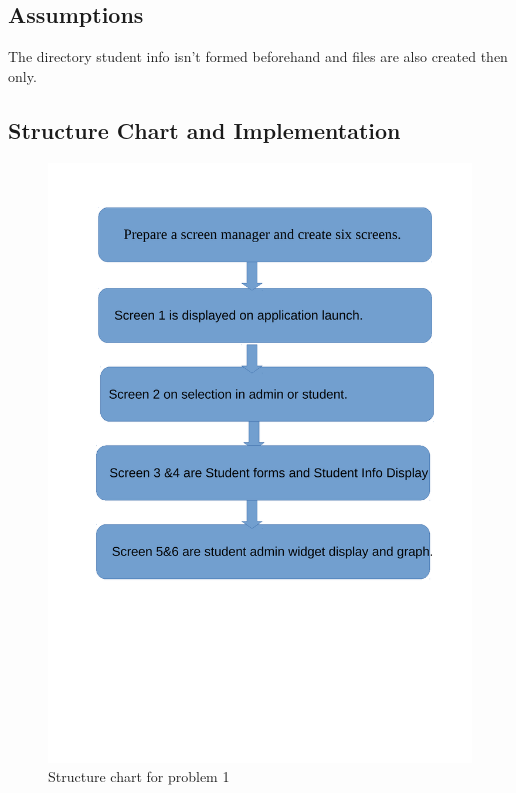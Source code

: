 \documentclass[11pt]{report}
\begin{document}
	\subsection{Assumptions}
	The directory student info isn't formed beforehand and files are also created then only.
	\pagebreak
	\subsection{Structure Chart and Implementation}
	\begin{figure}[h!]
	\centering
	\includegraphics[scale=0.7]{images/shots11}
	\caption{Structure chart for problem 1}
	\end{figure}		
	\pagebreak
\end{document}
